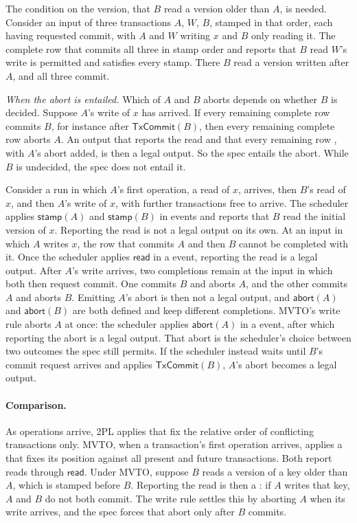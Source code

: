 The condition on the version, that $B$ read a version older than $A$, is
needed.  Consider an input of three transactions $A$, $W$, $B$, stamped in
that order, each having requested commit, with $A$ and $W$ writing $x$ and $B$
only reading it.  The complete row that commits all three in stamp order and
reports that $B$ read $W$'s write is permitted and satisfies every stamp.
There $B$ read a version written after $A$, and all three commit.

\emph{When the abort is entailed.}  Which of $A$ and $B$ aborts depends on
whether $B$ is decided.  Suppose $A$'s write of $x$ has arrived.  If every
remaining complete row commits $B$, for instance after $\mathsf{TxCommit}(B)$,
then every remaining complete row aborts $A$.  An output that reports the read
and that every remaining row \outrel, with $A$'s abort added, is then a legal
output.  So the spec entails the abort.  While $B$ is undecided, the spec does
not entail it.

Consider a run in which $A$'s first operation, a read of $x$, arrives, then
$B$'s read of $x$, and then $A$'s write of $x$, with further transactions free
to arrive.  The scheduler applies $\mathsf{stamp}(A)$ and $\mathsf{stamp}(B)$
in \commitment events and reports that $B$ read the initial version of $x$.
Reporting the read is not a legal output on its own.  At an input in which $A$
writes $x$, the row that commits $A$ and then $B$ cannot be completed with it.
Once the scheduler applies $\mathsf{read}$ in a \commitment event, reporting
the read is a legal output.  After $A$'s write arrives, two completions remain
at the input in which both then request commit.  One commits $B$ and aborts
$A$, and the other commits $A$ and aborts $B$.  Emitting $A$'s abort is then
not a legal output, and $\mathsf{abort}(A)$ and $\mathsf{abort}(B)$ are both
defined and keep different completions.  MVTO's write rule aborts $A$ at once:
the scheduler applies $\mathsf{abort}(A)$ in a \commitment event, after which
reporting the abort is a legal output.  That abort is the scheduler's choice
between two outcomes the spec still permits.  If the scheduler instead waits
until $B$'s commit request arrives and applies $\mathsf{TxCommit}(B)$, $A$'s
abort becomes a legal output.

\paragraph{Comparison.}
As operations arrive, 2PL applies \commitments that fix the relative order of
conflicting transactions only.  MVTO, when a transaction's first operation
arrives, applies a \commitment that fixes its position against all present and
future transactions.  Both report reads through $\mathsf{read}$.  Under MVTO,
suppose $B$ reads a version of a key older than $A$, which is stamped before
$B$.  Reporting the read is then a \commitment: if $A$ writes that key, $A$
and $B$ do not both commit.  The write rule settles this by aborting $A$ when
its write arrives, and the spec forces that abort only after $B$ commits.
